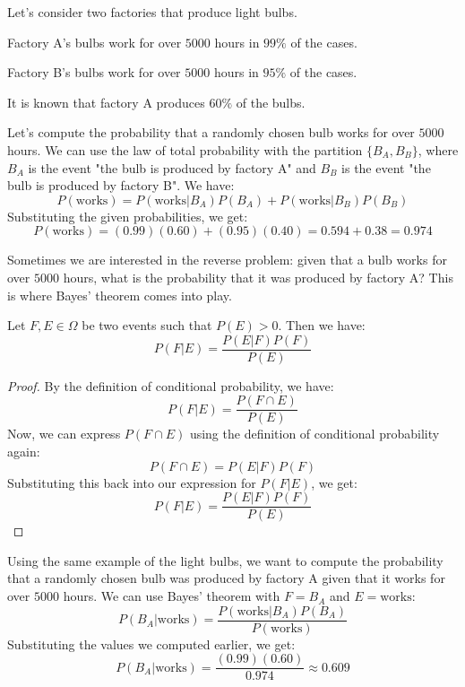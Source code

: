 \begin{eg}
    Let's consider two factories that produce light bulbs.
    \begin{citemize}
        \item Factory A's bulbs work for over $5000$ hours in $99\%$ of the cases.
        \item Factory B's bulbs work for over $5000$ hours in $95\%$ of the cases.
        \item It is known that factory A produces $60\%$ of the bulbs.
    \end{citemize}
    Let's compute the probability that a randomly chosen bulb works for over $5000$ hours. We can use the law of total probability with the partition $\{B_A, B_B\}$, where $B_A$ is the event "the bulb is produced by factory A" and $B_B$ is the event "the bulb is produced by factory B". We have:
    \[
        P(\text{works}) = P(\text{works}|B_A)P(B_A) + P(\text{works}|B_B)P(B_B)
    \]
    Substituting the given probabilities, we get:
    \[
        P(\text{works}) = (0.99)(0.60) + (0.95)(0.40) = 0.594 + 0.38 = 0.974
    \]
\end{eg}
Sometimes we are interested in the reverse problem: given that a bulb works for over $5000$ hours, what is the probability that it was produced by factory A? This is where Bayes' theorem comes into play.

\begin{theorem}
    Let $F, E \in \Omega$ be two events such that $P(E) > 0$. Then we have:
    \[
        P(F|E) = \frac{P(E|F)P(F)}{P(E)}
    \]
\end{theorem}
\begin{proof}
    By the definition of conditional probability, we have:
    \[
        P(F|E) = \frac{P(F \cap E)}{P(E)}
    \]
    Now, we can express $P(F \cap E)$ using the definition of conditional probability again:
    \[
        P(F \cap E) = P(E|F)P(F)
    \]
    Substituting this back into our expression for $P(F|E)$, we get:
    \[
        P(F|E) = \frac{P(E|F)P(F)}{P(E)}
    \]
\end{proof}

\begin{eg}
    Using the same example of the light bulbs, we want to compute the probability that a randomly chosen bulb was produced by factory A given that it works for over $5000$ hours. We can use Bayes' theorem with $F = B_A$ and $E = \text{works}$:
    \[
        P(B_A|\text{works}) = \frac{P(\text{works}|B_A)P(B_A)}{P(\text{works})}
    \]
    Substituting the values we computed earlier, we get:
    \[
        P(B_A|\text{works}) = \frac{(0.99)(0.60)}{0.974} \approx 0.609
    \]
\end{eg}

